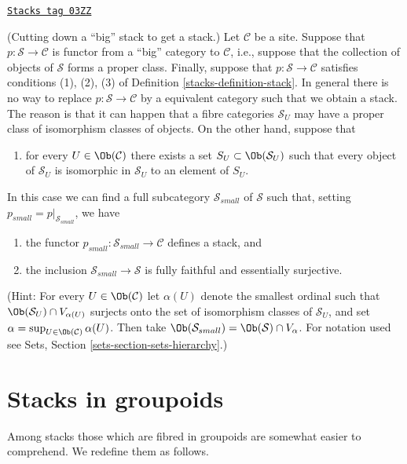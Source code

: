 \begin{remark}
\label{stacks-remark-stack-make-small}
\href{https://stacks.math.columbia.edu/tag/03ZZ}{\texttt{Stacks tag 03ZZ}}

(Cutting down a ``big'' stack to get a stack.)
Let $\mathcal{C}$ be a site. Suppose that $p : \mathcal{S} \to \mathcal{C}$
is functor from a ``big'' category to $\mathcal{C}$, i.e., suppose
that the collection of objects of $\mathcal{S}$ forms a proper class.
Finally, suppose that $p : \mathcal{S} \to \mathcal{C}$ satisfies
conditions (1), (2), (3) of
Definition \ref{stacks-definition-stack}.
In general there is no way to replace $p : \mathcal{S} \to \mathcal{C}$
by a equivalent category such that we obtain a stack. The reason is that
it can happen that a fibre categories $\mathcal{S}_U$ may have a proper
class of isomorphism classes of objects.
On the other hand, suppose that
\begin{enumerate}
\item[(4)] for every $U \in \Ob(\mathcal{C})$ there exists a set
$S_U \subset \Ob(\mathcal{S}_U)$ such that every object of
$\mathcal{S}_U$ is isomorphic in $\mathcal{S}_U$ to an element of $S_U$.
\end{enumerate}
In this case we can find a full subcategory $\mathcal{S}_{small}$
of $\mathcal{S}$ such that, setting $p_{small} = p|_{\mathcal{S}_{small}}$,
we have
\begin{enumerate}
\item[(a)] the functor $p_{small} : \mathcal{S}_{small} \to \mathcal{C}$
defines a stack, and
\item[(b)] the inclusion $\mathcal{S}_{small} \to \mathcal{S}$
is fully faithful and essentially surjective.
\end{enumerate}
(Hint: For every $U \in \Ob(\mathcal{C})$
let $\alpha(U)$ denote the smallest ordinal such that
$\Ob(\mathcal{S}_U) \cap V_{\alpha(U)}$ surjects onto the set
of isomorphism classes of $\mathcal{S}_U$, and set
$\alpha = \sup_{U \in \Ob(\mathcal{C})} \alpha(U)$.
Then take
$\Ob(\mathcal{S}_{small}) = \Ob(\mathcal{S}) \cap V_\alpha$.
For notation used see Sets, Section \ref{sets-section-sets-hierarchy}.)
\end{remark}

\section{Stacks in groupoids}
\label{stacks-section-stacks-in-groupoids}
Among stacks those which are fibred in groupoids are somewhat easier
to comprehend. We redefine them as follows.

